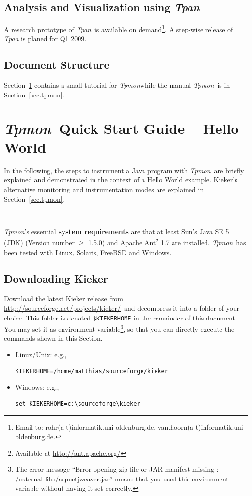 \documentclass[a4paper,12pt]{scrartcl}
\newcommand{\todobox}[1]{\marginpar{\footnotesize \textbf{ TODO:  #1 }}}
\newcommand{\tpmon}{\textit{Tpmon}}
\newcommand{\tpan}{\textit{Tpan}}
\newcommand{\kieker}{\textit{Kieker}}
\newcommand{\kiekerurl}{\small\url{http://sourceforge.net/projects/kieker/}\normalsize}
\begin{document}
\subsection{Analysis and Visualization using \tpan}
A research prototype of \tpan\ is available on demand\footnote{Email to: rohr(a-t)informatik.uni-oldenburg.de, van.hoorn(a-t)informatik.uni-oldenburg.de.}. A step-wise release of \tpan{} is planed for Q1 2009.

\subsection{Document Structure}

Section~\ref{sec.tpmon.tutorial} contains a small tutorial for \tpmon while the manual \tpmon\ is in Section~\ref{sec.tpmon}.%

\todobox{Matthias is here}

\section{\tpmon\ Quick Start Guide -- Hello World}\label{sec.tpmon.tutorial}
In the following, the steps to instrument a Java program with \tpmon\ are briefly explained and demonstrated in the context of a Hello World example. Kieker's alternative monitoring and instrumentation modes are explained in Section~\ref{sec.tpmon}.

\

\tpmon's essential \textbf{system requirements} are that at least Sun's Java SE 5 (JDK) (Version number $\geq$ 1.5.0) and Apache Ant\footnote{Available at \url{http://ant.apache.org/}} 1.7 are installed. \tpmon\ has been tested with Linux, Solaris, FreeBSD and Windows.

\subsection{Downloading Kieker}
Download the latest Kieker release from \kiekerurl \ and decompress it into a folder of your choice. This folder is denoted \texttt{\$KIEKERHOME} in the remainder of this document. You may set it as environment variable\footnote{The error message ``Error opening zip file or JAR manifest missing : /external-libs/aspectjweaver.jar'' means that you used this environment variable without having it set correctly.}, so that you can directly execute the commands shown in this Section.
\begin{itemize}
 \item Linux/Unix: e.g., %
\begin{lstlisting}[caption={}] 
KIEKERHOME=/home/matthias/sourceforge/kieker
\end{lstlisting}
\item Windows: e.g.,
\begin{lstlisting}[caption={}]
set KIEKERHOME=c:\sourceforge\kieker
\end{lstlisting}
\end{itemize}
\end{document}
